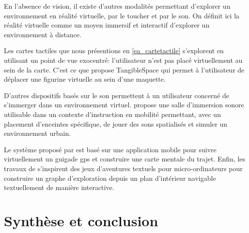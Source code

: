 

En l'absence de vision, il existe d'autres modalités permettant d'explorer un environnement en réalité virtuelle, par le toucher et par le son. On définit ici la réalité virtuelle comme un  moyen immersif et interactif d'explorer un environnement à distance.

\newpar{}

Les cartes tactiles que nous présentions en \ref{ea_cartetactile} s'explorent en utilisant un point de vue exocentré: l'utilisateur n'est pas placé virtuellement au sein de la carte. C'est ce que propose TangibleSpace \citep{Mulet2020} qui permet à l'utilisateur de déplacer une figurine virtuelle au sein d'une maquette.

\newpar{}

D'autres dispositifs basés sur le son permettent à un utilisateur concerné de s'immerger dans un environnement virtuel. \citet{Thome2021} propose une salle d'immersion sonore utilisable dans un contexte d'instruction en mobilité permettant, avec un placement d'enceintes spécifique, de jouer des sons spatialisés et simuler un environnement urbain. 

\newpar{}

Le système proposé par \citet{Guerreiro2017} est basé sur une application mobile pour suivre virtuellement un guigade \gls{gps} et construire une carte mentale du trajet. Enfin, les travaux de \citet{Arabsheibani2023} s'inspirent des jeux d'aventures textuels pour micro-ordinateurs pour construire un graphe d'exploration depuis un plan d'intérieur navigable textuellement de manière interactive.

\section{Synthèse et conclusion}


